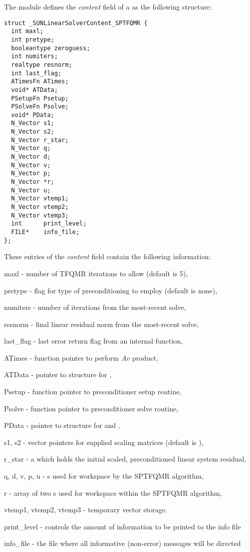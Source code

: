 The {\sunlinsolsptfqmr} module defines the \textit{content} field of a
 as the following structure:
\begin{verbatim}
struct _SUNLinearSolverContent_SPTFQMR {
  int maxl;
  int pretype;
  booleantype zeroguess;
  int numiters;
  realtype resnorm;
  int last_flag;
  ATimesFn ATimes;
  void* ATData;
  PSetupFn Psetup;
  PSolveFn Psolve;
  void* PData;
  N_Vector s1;
  N_Vector s2;
  N_Vector r_star;
  N_Vector q;
  N_Vector d;
  N_Vector v;
  N_Vector p;
  N_Vector *r;
  N_Vector u;
  N_Vector vtemp1;
  N_Vector vtemp2;
  N_Vector vtemp3;
  int      print_level;
  FILE*    info_file;
};
\end{verbatim}
These entries of the \emph{content} field contain the following
information:
\begin{args}
  \item[maxl] - number of TFQMR iterations to allow (default is 5),
  \item[pretype] - flag for type of preconditioning to employ
    (default is none),
  \item[numiters] - number of iterations from the most-recent solve,
  \item[resnorm] - final linear residual norm from the most-recent solve,
  \item[last\_flag] - last error return flag from an internal function,
  \item[ATimes] - function pointer to perform $Av$ product,
  \item[ATData] - pointer to structure for ,
  \item[Psetup] - function pointer to preconditioner setup routine,
  \item[Psolve] - function pointer to preconditioner solve routine,
  \item[PData] - pointer to structure for  and ,
  \item[s1, s2] - vector pointers for supplied scaling matrices
    (default is ),
  \item[r\_star] - a {\nvector} which holds the initial scaled,
    preconditioned linear system residual,
  \item[q, d, v, p, u] - {\nvector}s used for workspace by the SPTFQMR
    algorithm,
  \item [r] - array of two {\nvector}s used for workspace within the
    SPTFQMR algorithm,
  \item[vtemp1, vtemp2, vtemp3] - temporary vector storage.
  \item[print\_level] - controls the amount of information to be printed to the info file
  \item[info\_file]   - the file where all informative (non-error) messages will be directed
\end{args}
